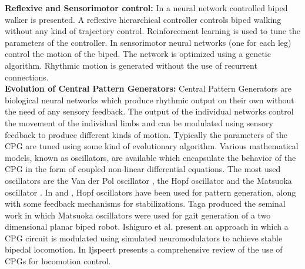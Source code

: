 \documentclass[12pt,twoside]{article}
\theoremstyle{plain}
\theoremstyle{definition}
\theoremstyle{remark}
\begin{document}
\textbf{Reflexive and Sensorimotor control: } In \cite{geng2005fast} a neural network controlled biped walker is presented. A reflexive hierarchical controller controls biped walking without any kind of trajectory control. Reinforcement learning is used to tune the parameters of the controller. In \cite{paul2005sensorimotor} sensorimotor neural networks (one for each leg) control the motion of the biped. The network is optimized using a genetic algorithm. Rhythmic motion is generated without the use of recurrent connections.\\
\textbf{Evolution of Central Pattern Generators: } Central Pattern Generators are biological neural networks which produce rhythmic output on their own without the need of any sensory feedback. The output of the individual networks control the movement of the individual limbs and can be modulated using sensory feedback to produce different kinds of motion. Typically the parameters of the CPG are tuned using some kind of evolutionary algorithm. Various mathematical models, known as oscillators, are available which encapsulate the behavior of the CPG in the form of coupled non-linear differential equations. The most used oscillators are the Van der Pol oscillator \cite{kanamaru2007van}, the Hopf oscillator \cite{Righetti2006} and the Matsuoka oscillator \cite{Matsuoka1985,Matsuoka1987}. In \cite{Righetti2006} and \cite{Kieboom2009}, Hopf oscillators have been used for pattern generation, along with some feedback mechanisms for stabilizations. Taga \cite{Taga1991} produced the seminal work in which Matsuoka oscillators were used for gait generation of a two dimensional planar biped robot. Ishiguro et al. \cite{Ishiguro2003} present an approach in which a CPG circuit is modulated using simulated neuromodulators to achieve stable bipedal locomotion. In \cite{Ijspeert2008} Ijspeert presents a comprehensive review of the use of CPGs for locomotion control.
\end{document}
